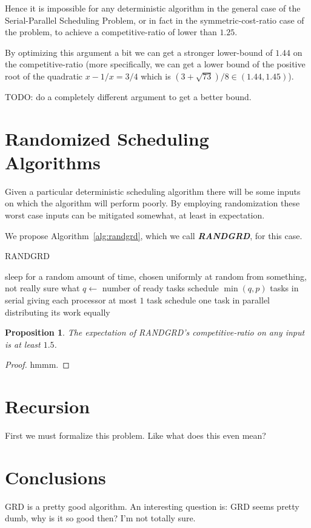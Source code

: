 \documentclass[twocolumn]{article}[10pt]
\newcommand{\defn}[1]{{\textit{\textbf{\boldmath #1}}}\xspace}
\newtheorem{proposition}{Proposition}
\begin{document}
Hence it is impossible for any deterministic algorithm in the
general case of the Serial-Parallel Scheduling Problem, or in
fact in the symmetric-cost-ratio case of the problem, to achieve
a competitive-ratio of lower than $1.25$.

By optimizing this argument a bit we can get a stronger
lower-bound of $1.44$ on the competitive-ratio (more
specifically, we can get a lower bound of the positive root of
the quadratic $x - 1/x = 3/4$ which is $(3+\sqrt{73})/8 \in
(1.44, 1.45)$).

{\color{red} TODO: do a completely different argument to get a
better bound. }

\section{Randomized Scheduling Algorithms}
Given a particular deterministic scheduling algorithm there will
be some inputs on which the algorithm will perform poorly. 
By employing randomization these worst case inputs can be
mitigated somewhat, at least in expectation.

We propose Algorithm~\ref{alg:randgrd}, which we call
\defn{RANDGRD}, for this case.

\begin{algorithm}
  \caption{RANDGRD}
  \label{alg:randgrd}
  \begin{algorithmic}
        \State sleep for a random amount of time, chosen
        uniformly at random from something, not really sure what 
        \State $q \gets $ number of ready tasks
          \State schedule $\min(q, p)$ tasks in serial
          \State giving each processor at most $1$ task
        \Else
          \State schedule one task in parallel
          \State distributing its work equally 
        \EndIf
      \EndIf
    \EndWhile
  \end{algorithmic}
\end{algorithm}

\begin{proposition}
  The expectation of RANDGRD's competitive-ratio on any input
  is at least $1.5$.
\end{proposition}
\begin{proof}
 hmmm. 
\end{proof}


\section{Recursion}
First we must formalize this problem. Like what does
this even mean?

\section{Conclusions}
GRD is a pretty good algorithm. 
An interesting question is: GRD seems pretty dumb, why is it
so good then? I'm not totally sure.



\end{document}

